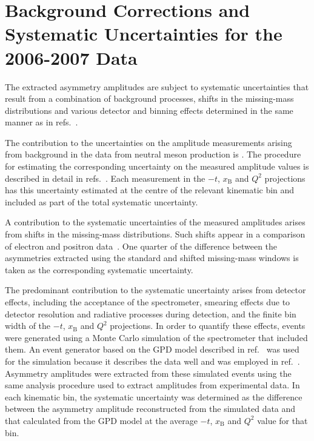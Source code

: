 \section{Background Corrections and Systematic Uncertainties for the
  2006-2007 Data}
The extracted asymmetry amplitudes are subject to systematic uncertainties that
result from a combination of background processes, 
shifts in the missing-mass distributions and various detector and binning
effects determined in the same manner as in refs.~\cite{Air08,Air09}.

The contribution to the uncertainties on the amplitude measurements
arising from background in the data from neutral meson
production is . The procedure for estimating the corresponding
uncertainty on the measured amplitude values is described in detail in
refs.~\cite{Air08,Air09}. Each measurement in the $-t$, $x_{\textrm{B}}$ and
  $Q^{2}$ projections has this uncertainty estimated at the
  centre of the relevant kinematic bin and included as part of the
  total systematic uncertainty.

A contribution to the systematic uncertainties of the
  measured amplitudes arises from shifts in  the
missing-mass distributions. Such shifts appear in a comparison of electron and positron data~\cite{Zei09,Bur10}. One
quarter of the difference between the asymmetries extracted using the standard
and shifted missing-mass windows is taken as the corresponding systematic
uncertainty. 

The predominant contribution to the systematic uncertainty arises from detector
effects, including the acceptance of the spectrometer, smearing
effects due to detector resolution and radiative processes during
  detection, and
the finite bin width of the $-t$, $x_{\textrm{B}}$ and $Q^{2}$ projections. In order to quantify these effects, events were generated using a Monte Carlo simulation of the spectrometer that included them. An event
generator based on the GPD model described in ref.~\cite{Van99,Goe01} was
used for the simulation because it describes the data well and was employed in ref.~\cite{Air09}. Asymmetry amplitudes were extracted
from these simulated events using the same analysis procedure used to
extract amplitudes from experimental data. In each kinematic bin, the
systematic uncertainty was determined as the difference between the asymmetry amplitude reconstructed from the simulated data and that
calculated from the GPD model at the average $-t$, $x_{\textrm{B}}$ and
$Q^{2}$ value for that bin.

